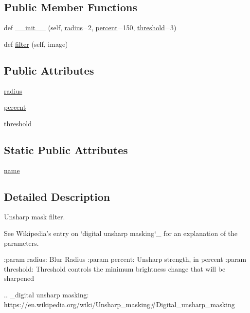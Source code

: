 \subsection*{Public Member Functions}
\begin{DoxyCompactItemize}
\item 
def \hyperlink{classPIL_1_1ImageFilter_1_1UnsharpMask_a8b66709aed2af4bbb2223defff120503}{\+\_\+\+\_\+init\+\_\+\+\_\+} (self, \hyperlink{classPIL_1_1ImageFilter_1_1UnsharpMask_a9679e65c2b0b13d1b70948e58636c15c}{radius}=2, \hyperlink{classPIL_1_1ImageFilter_1_1UnsharpMask_a42463ce5adfd3d4ee719fe3c10767519}{percent}=150, \hyperlink{classPIL_1_1ImageFilter_1_1UnsharpMask_ac9569265b0114dc45a11164c6134c6fe}{threshold}=3)
\item 
def \hyperlink{classPIL_1_1ImageFilter_1_1UnsharpMask_a5d7283edb038c1bcc0b742cee4f108f9}{filter} (self, image)
\end{DoxyCompactItemize}
\subsection*{Public Attributes}
\begin{DoxyCompactItemize}
\item 
\hyperlink{classPIL_1_1ImageFilter_1_1UnsharpMask_a9679e65c2b0b13d1b70948e58636c15c}{radius}
\item 
\hyperlink{classPIL_1_1ImageFilter_1_1UnsharpMask_a42463ce5adfd3d4ee719fe3c10767519}{percent}
\item 
\hyperlink{classPIL_1_1ImageFilter_1_1UnsharpMask_ac9569265b0114dc45a11164c6134c6fe}{threshold}
\end{DoxyCompactItemize}
\subsection*{Static Public Attributes}
\begin{DoxyCompactItemize}
\item 
\hyperlink{classPIL_1_1ImageFilter_1_1UnsharpMask_aaa7461d4341872ee1d38423a847b6033}{name}
\end{DoxyCompactItemize}


\subsection{Detailed Description}
\begin{DoxyVerb}Unsharp mask filter.

See Wikipedia's entry on `digital unsharp masking`_ for an explanation of
the parameters.

:param radius: Blur Radius
:param percent: Unsharp strength, in percent
:param threshold: Threshold controls the minimum brightness change that
  will be sharpened

.. _digital unsharp masking: https://en.wikipedia.org/wiki/Unsharp_masking#Digital_unsharp_masking\end{DoxyVerb}
 


